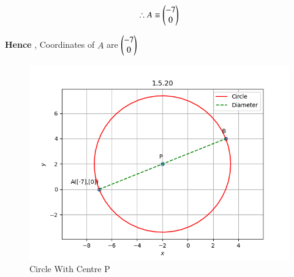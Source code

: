 \documentclass[journal]{IEEEtran}
\numberwithin{equation}{enumi}
\numberwithin{figure}{enumi}
\begin{document}
\begin{align*}
        \therefore A \equiv \begin{pmatrix}-7\\0\end{pmatrix}
\end{align*}

\textbf{Hence} , Coordinates of $A$ are $\begin{pmatrix}-7\\0\end{pmatrix}$ 

\begin{figure}[H]
    \centering
    \includegraphics[width=1\linewidth]{figs/circle_graph2.png}
    \caption{Circle With Centre P}
    \label{fig:placeholder_1}
\end{figure}
\end{document}
